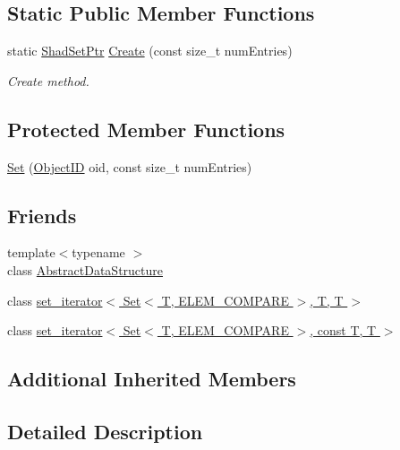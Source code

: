 \subsection*{Static Public Member Functions}
\begin{DoxyCompactItemize}
\item 
static \hyperlink{classshad_1_1Set_aa35015620563a346ef29432143fe1f44}{Shad\-Set\-Ptr} \hyperlink{classshad_1_1Set_a76419e199e1eb0b704f37bb4e5e107c9}{Create} (const size\-\_\-t num\-Entries)
\begin{DoxyCompactList}\small\item\em Create method. \end{DoxyCompactList}\end{DoxyCompactItemize}
\subsection*{Protected Member Functions}
\begin{DoxyCompactItemize}
\item 
\hyperlink{classshad_1_1Set_af23f31404ceabcf8c495c8dd77842c14}{Set} (\hyperlink{classshad_1_1Set_a05ba25e24c892602d707b21e3e4300b9}{Object\-I\-D} oid, const size\-\_\-t num\-Entries)
\end{DoxyCompactItemize}
\subsection*{Friends}
\begin{DoxyCompactItemize}
\item 
{\footnotesize template$<$typename $>$ }\\class \hyperlink{classshad_1_1Set_ab18afa4496cc863ddc11bab94b2adf57}{Abstract\-Data\-Structure}
\item 
class \hyperlink{classshad_1_1Set_a8a0a0fdcee0e492f8b2e3ad97cc1e397}{set\-\_\-iterator$<$ Set$<$ T, E\-L\-E\-M\-\_\-\-C\-O\-M\-P\-A\-R\-E $>$, T, T $>$}
\item 
class \hyperlink{classshad_1_1Set_a98fe017bca451c95c75b7e3d03b3d15a}{set\-\_\-iterator$<$ Set$<$ T, E\-L\-E\-M\-\_\-\-C\-O\-M\-P\-A\-R\-E $>$, const T, T $>$}
\end{DoxyCompactItemize}
\subsection*{Additional Inherited Members}


\subsection{Detailed Description}

